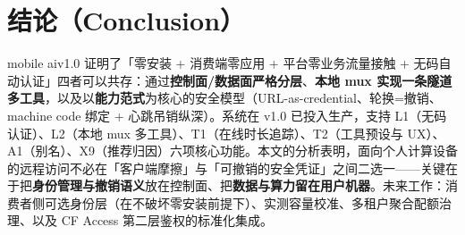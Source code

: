 \documentclass[10pt,a4paper]{article}
\newcommand{\sys}{mobile ai}
\begin{document}
\section{结论（Conclusion）}

\sys v1.0 证明了「零安装 + 消费端零应用 + 平台零业务流量接触 + 无码自动认证」四者可以共存：通过\textbf{控制面/数据面严格分层}、\textbf{本地 mux 实现一条隧道多工具}，以及以\textbf{能力范式}为核心的安全模型（URL-as-credential、轮换=撤销、machine code 绑定 + 心跳吊销纵深）。系统在 v1.0 已投入生产，支持 L1（无码认证）、L2（本地 mux 多工具）、T1（在线时长追踪）、T2（工具预设与 UX）、A1（别名）、X9（推荐归因）六项核心功能。本文的分析表明，面向个人计算设备的远程访问不必在「客户端摩擦」与「可撤销的安全凭证」之间二选一——关键在于把\textbf{身份管理与撤销语义}放在控制面、把\textbf{数据与算力留在用户机器}。未来工作：消费者侧可选身份层（在不破坏零安装前提下）、实测容量校准、多租户聚合配额治理、以及 CF Access 第二层鉴权的标准化集成。

\end{document}

